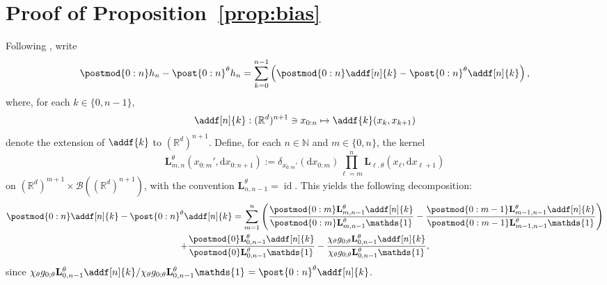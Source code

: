 \documentclass{article}
\newcommand{\uksymbol}{\ell}
\newcommand{\intvect}[2]{\{ #1, #2 \}}
\newcommand{\ud}[1]{\uksymbol_{#1}}
\newcommand{\nset}{\mathbb{N}}
\newcommand{\1}{\mathbbm{1}}
\newcommand{\uk}[1]{\mathbf{L}_{#1}}
\newcommand{\md}[1]{g_{#1}}
\newcommand{\parvec}{\theta}
\newcommand{\hd}[1]{q_{#1}}
\def\1{\mathds{1}}
\newcommand{\rmd}{\ensuremath{\mathrm{d}}}
\newcommand{\eqdef}{\ensuremath{:=}}
\begin{document}
\section{Proof of Proposition~\ref{prop:bias}}
\label{sec:proof}
Following \cite{gloaguen2019pseudo}, write 
$$
\postmod{0:n} h_n - \post{0:n}^\theta h_n = \sum_{k = 0}^{n - 1} \left( \postmod{0:n} \addf[n]{k} - \post{0:n}^\theta \addf[n]{k} \right), 
$$
where, for each $k \in \intvect{0}{n - 1}$, 
\begin{equation} \label{eq:def:addf}
\addf[n]{k} : (\mathbb{R}^d)^{n+1} \ni x_{0:n} \mapsto \addf{k}(x_k, x_{k + 1}) 
\end{equation}
denote the extension of $\addf{k}$ to $(\mathbb{R}^d)^{n+1}$. Define, for each $n \in \nset$ and $m \in \intvect{0}{n}$, the kernel 
\begin{equation} \label{eq:def:uk:products}
    \uk{m, n}^\theta(x_{0:m}', \rmd x_{0:n + 1}) \eqdef \delta_{x_{0:m}'}(\rmd x_{0:m}) \prod_{\ell = m}^n \uk{\ell,\theta}(x_\ell, \rmd x_{\ell + 1}) 
\end{equation}
on $(\mathbb{R}^d)^{m+1} \times \mathcal{B}((\mathbb{R}^d)^{n + 1})$, with the convention $\uk{n, n - 1}^\theta = \operatorname{id}$.  This yields the following decomposition:
\begin{multline*}
\postmod{0:n} \addf[n]{k} - \post{0:n}^\theta \addf[n]{k} = 
\sum_{m = 1}^n \left( \frac{\postmod{0:m} \uk{m, n - 1}^\theta \addf[n]{k}}{\postmod{0:m} \uk{m, n - 1}^\theta \1_{}} - \frac{\postmod{0:m - 1} \uk{m - 1, n - 1}^\theta \addf[n]{k}}{\postmod{0:m - 1} \uk{m - 1, n - 1}^\theta \1_{}} \right) \\ + \frac{\postmod{0} \uk{0, n - 1}^\theta \addf[n]{k}}{\postmod{0} \uk{0, n - 1}^\theta \1_{}} - \frac{\chi_\theta \md{0;\parvec}\uk{0, n - 1}^\theta \addf[n]{k}}{\chi_\theta\md{0;\parvec}\uk{0, n - 1}^\theta \1_{}},
\end{multline*}
since $\chi_\theta \md{0;\parvec} \uk{0, n - 1}^\theta \addf[n]{k}/\chi_\theta\md{0;\parvec}\uk{0, n - 1}^\theta \1_{} = \post{0:n}^\theta \addf[n]{k}$.
\end{document}

